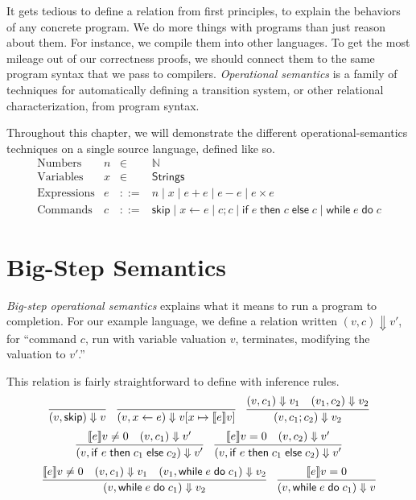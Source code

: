 \documentclass{amsbook}
\theoremstyle{definition}
\theoremstyle{remark}
\numberwithin{section}{chapter}
\numberwithin{equation}{chapter}
\begin{document}
It gets tedious to define a relation from first principles, to explain the behaviors of any concrete program.
We do more things with programs than just reason about them.
For instance, we compile them into other languages.
To get the most mileage out of our correctness proofs, we should connect them to the same program syntax that we pass to compilers.
\emph{Operational semantics} is a family of techniques for automatically defining a transition system, or other relational characterization, from program syntax.

\newcommand{\assign}[2]{#1 \leftarrow #2}
\newcommand{\skipe}[0]{\mathsf{skip}}
\newcommand{\ifte}[3]{\mathsf{if} \; #1 \; \mathsf{then} \; #2 \; \mathsf{else} \; #3}
\newcommand{\while}[2]{\mathsf{while} \; #1 \; \mathsf{do} \; #2}

Throughout this chapter, we will demonstrate the different operational-semantics techniques on a single source language, defined like so.
$$\begin{array}{rrcl}
  \textrm{Numbers} & n &\in& \mathbb N \\
  \textrm{Variables} & x &\in& \mathsf{Strings} \\
  \textrm{Expressions} & e &::=& n \mid x \mid e + e \mid e - e \mid e \times e \\
  \textrm{Commands} & c &::=& \skipe \mid \assign{x}{e} \mid c; c \mid \ifte{e}{c}{c} \mid \while{e}{c}
\end{array}$$


\section{Big-Step Semantics}

\newcommand{\bigstep}[2]{#1 \Downarrow #2}

\emph{Big-step operational semantics} explains what it means to run a program to completion.
For our example language, we define a relation written $\bigstep{(v, c)}{v'}$, for ``command $c$, run with variable valuation $v$, terminates, modifying the valuation to $v'$.''

This relation is fairly straightforward to define with inference rules.
\encoding
$$\infer{\bigstep{(v, \skipe)}{v}}{}
\quad \infer{\bigstep{(v, \assign{x}{e})}{\mupd{v}{x}{\denote{e}v}}}{}
\quad \infer{\bigstep{(v, c_1; c_2)}{v_2}}{
  \bigstep{(v, c_1)}{v_1}
  & \bigstep{(v_1, c_2)}{v_2}
}$$
$$\infer{\bigstep{(v, \ifte{e}{c_1}{c_2})}{v'}}{
  \denote{e}{v} \neq 0
  & \bigstep{(v, c_1)}{v'}
}
\quad \infer{\bigstep{(v, \ifte{e}{c_1}{c_2})}{v'}}{
  \denote{e}{v} = 0
  & \bigstep{(v, c_2)}{v'}
}$$
$$\infer{\bigstep{(v, \while{e}{c_1})}{v_2}}{
  \denote{e}{v} \neq 0
  & \bigstep{(v, c_1)}{v_1}
  & \bigstep{(v_1, \while{e}{c_1})}{v_2}
}
\quad \infer{\bigstep{(v, \while{e}{c_1})}{v}}{
  \denote{e}{v} = 0
}$$
\end{document}
